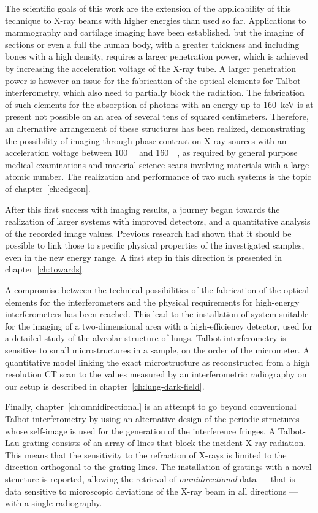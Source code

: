 The scientific goals of this work are the extension of the applicability of
this technique to X-ray beams with higher energies than used so far.
Applications to mammography and cartilage imaging have been established, but
the imaging of sections or even a full the human body, with a greater thickness
and including bones with a high density, requires a larger penetration
power, which is achieved by increasing the acceleration voltage of the X-ray
tube. A larger penetration power is however an issue for the fabrication of
the optical elements for Talbot interferometry, which also need to partially block the
radiation. The fabrication of such elements for the
absorption of photons with an energy up to \SI{160}{\kilo\eV} is at present
not possible on an area of several tens of squared centimeters. Therefore,
an alternative arrangement of these structures has been realized, demonstrating
the possibility of imaging through phase contrast on X-ray sources with an
acceleration voltage between \SI{100}{\kilo\voltpeak} and
\SI{160}{\kilo\voltpeak}, as required by general purpose medical
examinations and material science scans involving materials with a large
atomic number. The realization and performance of two such systems is the
topic of chapter~\ref{ch:edgeon}.

After this first success with imaging results, a journey began towards
 the realization of larger systems with improved detectors, 
and a quantitative analysis of the recorded image values. Previous research
had shown that it should be possible to link those to specific physical
properties of the investigated samples, even in the new energy range. A first step
in this direction is presented in chapter~\ref{ch:towards}.

A compromise between the technical possibilities of the
fabrication of the optical elements for the interferometers and the physical
requirements for high-energy interferometers has been reached.
This lead to the installation of system suitable for the imaging of a two-dimensional
area with a high-efficiency detector, used for a detailed
study of the alveolar structure of lungs. Talbot interferometry is sensitive to
small microstructures in a sample, on the order of the micrometer. A
quantitative model linking the exact microstructure as reconstructed from a
high resolution \ac{CT} scan to the values measured by an interferometric
radiography on our setup is described in chapter~\ref{ch:lung-dark-field}.

Finally, chapter~\ref{ch:omnidirectional} is an attempt to go beyond
conventional Talbot interferometry by using an alternative design of the
periodic structures whose self-image is used for the generation of the
interference fringes. A Talbot-Lau grating consists of an array of lines that block the
incident X-ray radiation. This means that the sensitivity to the refraction
of X-rays is limited to the
direction orthogonal to
the grating lines. The installation of gratings with a novel structure is
reported, allowing the retrieval of \emph{omnidirectional} data --- that is
data sensitive to microscopic deviations of the X-ray beam in all directions
--- with a single radiography.
